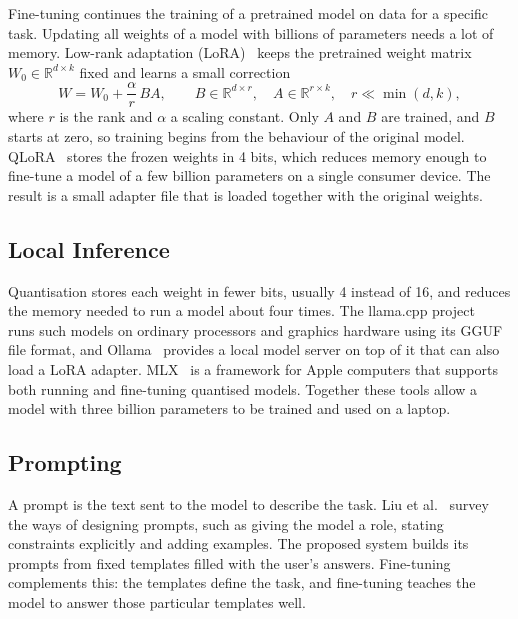 Fine-tuning continues the training of a pretrained model on data for a specific task. Updating all weights of a model with billions of parameters needs a lot of memory. Low-rank adaptation (LoRA)~\cite{hu2022lora} keeps the pretrained weight matrix $W_0 \in \mathbb{R}^{d \times k}$ fixed and learns a small correction
\begin{equation}
W = W_0 + \frac{\alpha}{r}\,BA, \qquad B \in \mathbb{R}^{d \times r},\quad A \in \mathbb{R}^{r \times k},\quad r \ll \min(d,k),
\label{eq:lora}
\end{equation}
where $r$ is the rank and $\alpha$ a scaling constant. Only $A$ and $B$ are trained, and $B$ starts at zero, so training begins from the behaviour of the original model. QLoRA~\cite{dettmers2023qlora} stores the frozen weights in 4 bits, which reduces memory enough to fine-tune a model of a few billion parameters on a single consumer device. The result is a small adapter file that is loaded together with the original weights.

\subsection{Local Inference}

Quantisation stores each weight in fewer bits, usually 4 instead of 16, and reduces the memory needed to run a model about four times. The llama.cpp project~\cite{gerganov2023llamacpp} runs such models on ordinary processors and graphics hardware using its GGUF file format, and Ollama~\cite{ollama2024} provides a local model server on top of it that can also load a LoRA adapter. MLX~\cite{hannun2023mlx} is a framework for Apple computers that supports both running and fine-tuning quantised models. Together these tools allow a model with three billion parameters to be trained and used on a laptop.

\subsection{Prompting}

A prompt is the text sent to the model to describe the task. Liu et al.~\cite{liu2023promptsurvey} survey the ways of designing prompts, such as giving the model a role, stating constraints explicitly and adding examples. The proposed system builds its prompts from fixed templates filled with the user's answers. Fine-tuning complements this: the templates define the task, and fine-tuning teaches the model to answer those particular templates well.

